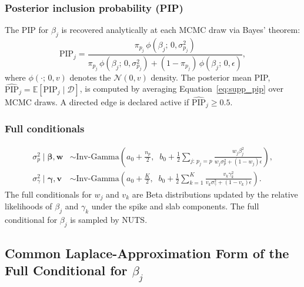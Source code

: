 \documentclass[12pt]{article}
\begin{document}
\subsubsection{Posterior inclusion probability (PIP)}
The PIP for $\beta_j$ is recovered analytically at each MCMC draw via Bayes'
theorem:
\begin{equation}\label{eq:supp_pip}
\mathrm{PIP}_j = \frac{\pi_{p_j}\,\phi(\beta_j;\, 0, \sigma^2_{p_j})}{\pi_{p_j}\,\phi(\beta_j;\, 0, \sigma^2_{p_j}) + (1-\pi_{p_j})\,\phi(\beta_j;\, 0, \epsilon)},
\end{equation}
where $\phi(\cdot;\, 0, v)$ denotes the $\mathcal{N}(0, v)$ density. The
posterior mean PIP, $\widehat{\mathrm{PIP}}_j = \mathbb{E}[\mathrm{PIP}_j \mid \mathcal{D}]$,
is computed by averaging Equation~\eqref{eq:supp_pip} over MCMC draws. A
directed edge is declared active if $\widehat{\mathrm{PIP}}_j \geq 0.5$.

\subsubsection{Full conditionals}
\begin{align}
\sigma^2_p \mid \boldsymbol{\beta}, \mathbf{w} &\sim \mathrm{Inv\text{-}Gamma}\!\left(a_0 + \frac{n_p}{2},\;\; b_0 + \frac{1}{2}\sum_{j:\,p_j=p} \frac{w_j \beta_j^2}{w_j \sigma^2_p + (1-w_j)\epsilon}\right),\\
\sigma^2_\gamma \mid \boldsymbol{\gamma}, \mathbf{v} &\sim \mathrm{Inv\text{-}Gamma}\!\left(a_0 + \frac{K}{2},\;\; b_0 + \frac{1}{2}\sum_{k=1}^K \frac{v_k \gamma_k^2}{v_k \sigma^2_\gamma + (1-v_k)\epsilon}\right).
\end{align}
The full conditionals for $w_j$ and $v_k$ are Beta distributions updated by
the relative likelihoods of $\beta_j$ and $\gamma_k$ under the spike and slab
components. The full conditional for $\beta_j$ is sampled by NUTS.

\subsection{Common Laplace-Approximation Form of the Full Conditional for $\beta_j$}
\end{document}

